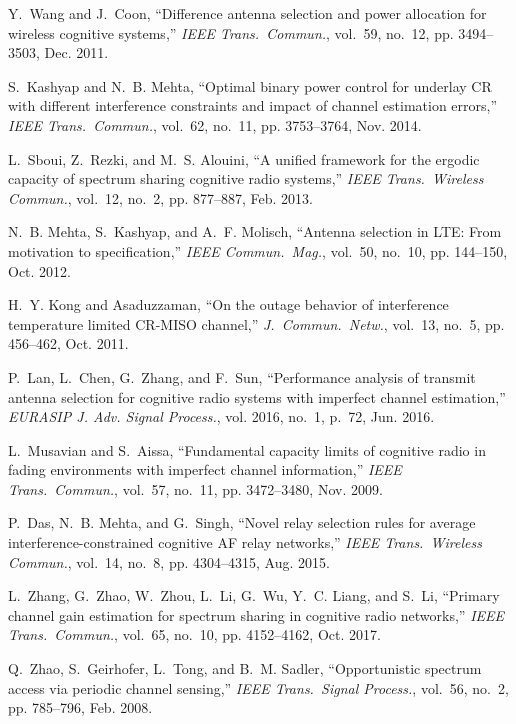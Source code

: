 \documentclass[journal]{IEEEtran}
\begin{document}
\begin{thebibliography}{10}
	Y.~Wang and J.~Coon, ``Difference antenna selection and power allocation for
	wireless cognitive systems,'' \emph{IEEE Trans.\ Commun.}, vol.~59, no.~12,
	pp. 3494--3503, Dec. 2011.
	
	S.~Kashyap and N.~B. Mehta, ``Optimal binary power control for underlay {CR}
	with different interference constraints and impact of channel estimation
	errors,'' \emph{IEEE Trans.\ Commun.}, vol.~62, no.~11, pp. 3753--3764, Nov.
	2014.
	
	L.~Sboui, Z.~Rezki, and M.~S. Alouini, ``A unified framework for the ergodic
	capacity of spectrum sharing cognitive radio systems,'' \emph{IEEE Trans.\
		Wireless Commun.}, vol.~12, no.~2, pp. 877--887, Feb. 2013.
	
	N.~B. Mehta, S.~Kashyap, and A.~F. Molisch, ``Antenna selection in {LTE}: From
	motivation to specification,'' \emph{IEEE Commun.\ Mag.}, vol.~50, no.~10,
	pp. 144--150, Oct. 2012.
	
	H.~Y. Kong and Asaduzzaman, ``On the outage behavior of interference
	temperature limited {CR-MISO} channel,'' \emph{J.\ Commun.\ Netw.}, vol.~13,
	no.~5, pp. 456--462, Oct. 2011.
	
	P.~Lan, L.~Chen, G.~Zhang, and F.~Sun, ``Performance analysis of transmit
	antenna selection for cognitive radio systems with imperfect channel
	estimation,'' \emph{EURASIP {J.} Adv. Signal Process.}, vol. 2016, no.~1,
	p.~72, Jun. 2016.
	
	L.~Musavian and S.~Aissa, ``Fundamental capacity limits of cognitive radio in
	fading environments with imperfect channel information,'' \emph{IEEE Trans.\
		Commun.}, vol.~57, no.~11, pp. 3472--3480, Nov. 2009.
	
	P.~Das, N.~B. Mehta, and G.~Singh, ``Novel relay selection rules for average
	interference-constrained cognitive {AF} relay networks,'' \emph{IEEE Trans.\
		Wireless Commun.}, vol.~14, no.~8, pp. 4304--4315, Aug. 2015.
	
	\bibitem{Zhang_2017_tcom}
	L.~Zhang, G.~Zhao, W.~Zhou, L.~Li, G.~Wu, Y.~C. Liang, and S.~Li, ``Primary
	channel gain estimation for spectrum sharing in cognitive radio networks,''
	\emph{IEEE Trans.\ Commun.}, vol.~65, no.~10, pp. 4152--4162, Oct. 2017.
	
	\bibitem{Zhao_2008_TSP}
	Q.~Zhao, S.~Geirhofer, L.~Tong, and B.~M. Sadler, ``Opportunistic spectrum
	access via periodic channel sensing,'' \emph{IEEE Trans.\ Signal Process.},
	vol.~56, no.~2, pp. 785--796, Feb. 2008.
	

\end{thebibliography}
\end{document}
